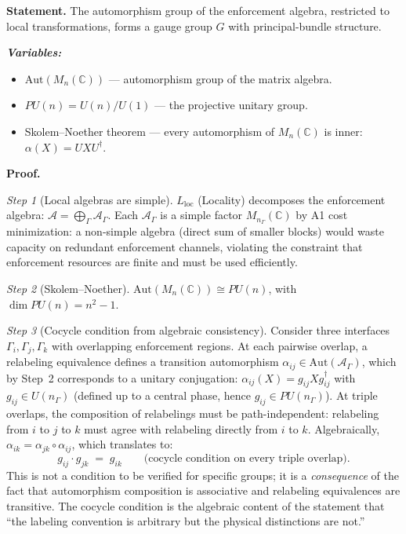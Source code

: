 \documentclass[11pt]{article}
\newenvironment{varlist}{\begin{itemize}[nosep,leftmargin=2em]}{\end{itemize}}
\begin{document}
\begin{tcolorbox}[apfbox, title={T3: $L_{\mathrm{loc}}$ (Locality) $\to$ Gauge Structure}]
\textbf{Statement.}  The automorphism group of the enforcement algebra, restricted to local transformations, forms a gauge group $G$ with principal-bundle structure.

\smallskip\noindent\textbf{\textit{Variables:}}
\begin{varlist}
\item $\mathrm{Aut}(M_n(\mathbb{C}))$ --- automorphism group of the matrix algebra.
\item $PU(n) = U(n)/U(1)$ --- the projective unitary group.
\item Skolem--Noether theorem --- every automorphism of $M_n(\mathbb{C})$ is inner: $\alpha(X) = UXU^\dagger$.
\end{varlist}

\smallskip\noindent\textbf{Proof.}

\textit{Step 1} (Local algebras are simple).  $L_{\mathrm{loc}}$ (Locality) decomposes the enforcement algebra: $\mathcal{A} = \bigoplus_\Gamma \mathcal{A}_\Gamma$.  Each $\mathcal{A}_\Gamma$ is a simple factor $M_{n_\Gamma}(\mathbb{C})$ by A1 cost minimization: a non-simple algebra (direct sum of smaller blocks) would waste capacity on redundant enforcement channels, violating the constraint that enforcement resources are finite and must be used efficiently.

\textit{Step 2} (Skolem--Noether).  $\mathrm{Aut}(M_n(\mathbb{C})) \cong PU(n)$, with $\dim PU(n) = n^2 - 1$.

\textit{Step 3} (Cocycle condition from algebraic consistency).  Consider three interfaces $\Gamma_i, \Gamma_j, \Gamma_k$ with overlapping enforcement regions.  At each pairwise overlap, a relabeling equivalence defines a transition automorphism $\alpha_{ij} \in \mathrm{Aut}(\mathcal{A}_\Gamma)$, which by Step~2 corresponds to a unitary conjugation: $\alpha_{ij}(X) = g_{ij} X g_{ij}^\dagger$ with $g_{ij} \in U(n_\Gamma)$ (defined up to a central phase, hence $g_{ij} \in PU(n_\Gamma)$).  At triple overlaps, the composition of relabelings must be path-independent: relabeling from $i$ to $j$ to $k$ must agree with relabeling directly from $i$ to $k$.  Algebraically, $\alpha_{ik} = \alpha_{jk} \circ \alpha_{ij}$, which translates to:
\begin{equation}
g_{ij} \cdot g_{jk} \;=\; g_{ik} \qquad \text{(cocycle condition on every triple overlap)}.
\end{equation}
This is not a condition to be verified for specific groups; it is a \emph{consequence} of the fact that automorphism composition is associative and relabeling equivalences are transitive.  The cocycle condition is the algebraic content of the statement that ``the labeling convention is arbitrary but the physical distinctions are not.''


\end{tcolorbox}
\end{document}

